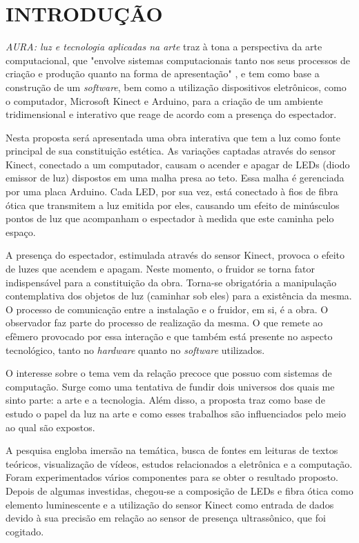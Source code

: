 %
%

\chapter{INTRODUÇÃO}\label{chap:introducao}

\textit{AURA: luz e tecnologia aplicadas na arte} traz à tona a perspectiva da arte computacional, que "envolve sistemas computacionais tanto nos seus processos de criação e produção quanto na forma de apresentação" \cite[p. 36]{boone}, e tem como base a construção de um \textit{software}, bem como a utilização dispositivos eletrônicos, como o computador, Microsoft Kinect e Arduino, para a criação de um ambiente tridimensional e interativo que reage de acordo com a presença do espectador.

Nesta proposta será apresentada uma obra interativa que tem a luz como fonte principal de sua constituição estética. As variações captadas através do sensor Kinect, conectado a um computador, causam o acender e apagar de LEDs (diodo emissor de luz) dispostos em uma malha presa ao teto. Essa malha é gerenciada por uma placa Arduino. Cada LED, por sua vez, está conectado à fios de fibra ótica que transmitem a luz emitida por eles, causando um efeito de minúsculos pontos de luz que acompanham o espectador à medida que este caminha pelo espaço.

A presença do espectador, estimulada através do sensor Kinect, provoca o efeito de luzes que acendem e apagam. Neste momento, o fruidor se torna fator indispensável para a constituição da obra. Torna-se obrigatória a manipulação contemplativa dos objetos de luz  (caminhar sob eles) para a existência da mesma. O processo de comunicação entre a instalação e o fruidor, em si, é a obra. O observador faz parte do processo de realização da mesma. O que remete ao efêmero provocado por essa interação e que também está presente no aspecto tecnológico, tanto no \textit{hardware} quanto no \textit{software} utilizados. 

O interesse sobre o tema vem da relação precoce que possuo com sistemas de computação. Surge como uma tentativa de fundir dois universos dos quais me sinto parte: a arte e a tecnologia. Além disso, a proposta traz como base de estudo o papel da luz na arte e como esses trabalhos são influenciados pelo meio ao qual são expostos.

A pesquisa engloba imersão na temática, busca de fontes em leituras de textos teóricos, visualização de vídeos, estudos relacionados a eletrônica e a computação. Foram experimentados vários componentes para se obter o resultado proposto. Depois de algumas investidas, chegou-se a composição de LEDs e fibra ótica como elemento luminescente e a utilização do sensor Kinect como entrada de dados devido à sua precisão em relação ao sensor de presença ultrassônico, que foi cogitado.